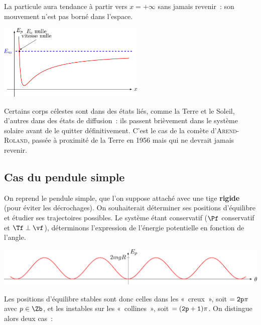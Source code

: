 \documentclass[../../main/main.tex]{subfiles}
\begin{document}
\begin{tcb*}
\begin{minipage}{0.47\linewidth}
\begin{center}
			\bfseries
		\end{center}
		La particule aura tendance à partir vers $x = +\infty$ sans jamais revenir~:
		son mouvement n’est pas borné dans l’espace.
		\begin{center}
			\includegraphics[width=7cm]{stab_diff}
		\end{center}
	\end{minipage}
\end{tcb*}

Certains corps célestes sont dans des états liés, comme la Terre et le Soleil,
d'autres dans des états de diffusion~: ils passent brièvement dans le système
solaire avant de le quitter définitivement. C'est le cas de la comète
d'\textsc{Arend-Roland}, passée à proximité de la Terre en 1956 mais qui ne
devrait jamais revenir.

\subsection{Cas du pendule simple}
On reprend le pendule simple, que l'on suppose attaché avec une tige
\textbf{rigide} (pour éviter les décrochages). On souhaiterait déterminer ses
positions d'équilibre et étudier ses trajectoires possibles. Le système étant
conservatif ($\Pf$ conservatif et $\Tf\perp\vf$), déterminons l'expression de
l'énergie potentielle en fonction de l'angle.

\smallbreak\noindent
{}
\begin{center}
	\includegraphics[scale=1]{stab_pend-a}
\end{center}
Les positions d'équilibre stables sont donc celles dans les «~creux~», soit $\tt =
	2p\pi$ avec $p\in\Zb$, et les instables sur les «~collines~», soit $\tt =
	(2p+1)\pi$. On distingue alors deux cas~:
\end{document}
